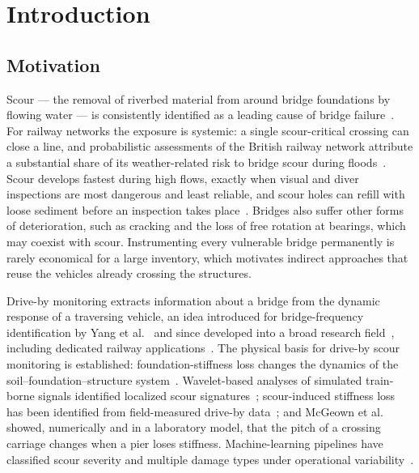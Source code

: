 \section{Introduction}
\label{sec:introduction}

\subsection{Motivation}
\label{sec:motivation}

Scour --- the removal of riverbed material from around bridge foundations by
flowing water --- is consistently identified as a leading cause of bridge
failure~\cite{wardhana2003analysis, arneson2012hec18}. For railway networks the
exposure is systemic: a single scour-critical crossing can close a line, and
probabilistic assessments of the British railway network attribute a
substantial share of its weather-related risk to bridge scour during
floods~\cite{lamb2019scour}. Scour develops fastest during high flows, exactly
when visual and diver inspections are most dangerous and least reliable, and
scour holes can refill with loose sediment before an inspection takes
place~\cite{prendergast2014review, arneson2012hec18}. Bridges also suffer other
forms of deterioration, such as cracking and the loss of free rotation at
bearings, which may coexist with scour. Instrumenting every vulnerable bridge
permanently is rarely economical for a large inventory, which motivates
indirect approaches that reuse the vehicles already crossing the structures.

Drive-by monitoring extracts information about a bridge from the dynamic
response of a traversing vehicle, an idea introduced for bridge-frequency
identification by Yang et al.~\cite{yang2004extracting} and since developed
into a broad research field~\cite{malekjafarian2015review}, including dedicated
railway applications~\cite{braganca2023review, souza2023review}. The physical
basis for drive-by scour monitoring is established: foundation-stiffness loss
changes the dynamics of the soil--foundation--structure
system~\cite{prendergast2013investigation, prendergast2016determining}.
Wavelet-based analyses of simulated train-borne signals identified localized
scour signatures~\cite{fitzgerald2019drive}; scour-induced stiffness loss has
been identified from field-measured drive-by data~\cite{tola2025scour}; and
McGeown et al.~\cite{mcgeown2024pitch} showed, numerically and in a laboratory
model, that the pitch of a crossing carriage changes when a pier loses
stiffness. Machine-learning pipelines have classified scour severity and
multiple damage types under operational
variability~\cite{fernandes2024driveby, fernandes2025early,
fernandes2026early, fernandes2026canelas}.

